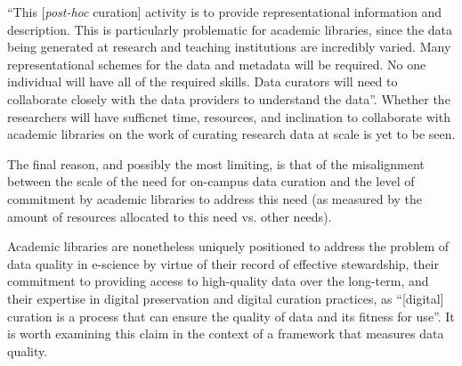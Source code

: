 \documentclass{acm_proc_article-sp}
\begin{document}
``This [\textit{post-hoc} curation] activity is to provide
representational information and description. This is particularly
problematic for academic libraries, since the data being generated at
research and teaching institutions are incredibly varied. Many
representational schemes for the data and metadata will be
required. No one individual will have all of the required skills. Data
curators will need to collaborate closely with the data providers to
understand the data''\cite{heidorn:libraries}. Whether the researchers
will have sufficnet time, resources, and inclination to collaborate
with academic libraries on the work of curating research data at scale
is yet to be seen.

The final reason, and possibly the most limiting, is that of the
misalignment between the scale of the need for on-campus data curation
and the level of commitment by academic libraries to address this
need (as measured by the amount of resources allocated to this need
vs. other needs).

Academic libraries are nonetheless uniquely positioned to address the
problem of data quality in e-science by virtue of their record of
effective stewardship, their commitment to providing access to
high-quality data over the long-term, and their expertise in digital
preservation and digital curation practices, as ``[digital] curation is a
process that can ensure the quality of data and its fitness for
use''\cite{curry:community}.  It is worth examining this claim in the
context of a framework that measures data quality.

%
\end{document}

